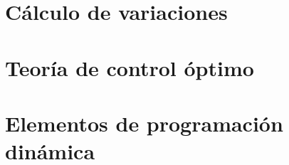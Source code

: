 \documentclass[8pt,a4paper]{extarticle}
\begin{document}
\begin{multicols}{3}
	\newpage

	\section{Cálculo de variaciones}

	\newpage

	\section{Teoría de control óptimo}

	\newpage

	\section{Elementos de programación dinámica}

	\vfill\eject
	\columnbreak
\end{multicols}
\end{document}
